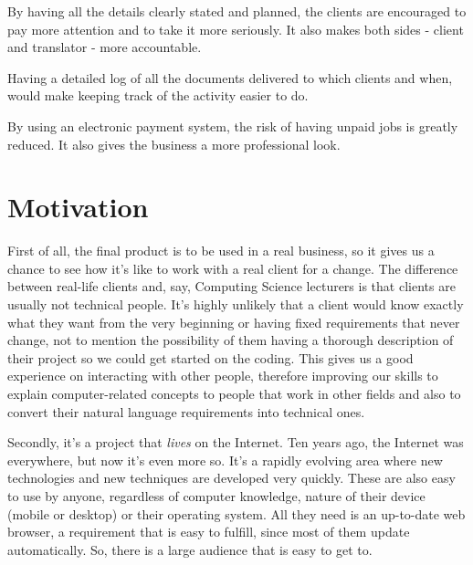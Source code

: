 \documentclass{article}
\begin{document}
By having all the details clearly stated and planned, the clients are encouraged
to pay more attention and to take it more seriously. It also makes both sides
- client and translator - more accountable.

Having a detailed log of all the documents delivered to which clients and when,
would make keeping track of the activity easier to do.

By using an electronic payment system, the risk of having unpaid jobs is greatly
reduced. It also gives the business a more professional look.

\section*{Motivation}
First of all, the final product is to be used in a real business, so it gives
us a chance to see how it's like to work with a real client for a change.
The difference between real-life clients and, say, Computing Science lecturers
is that clients are usually not technical people. It's highly unlikely that a 
client would know exactly what they want from the very beginning or having
fixed requirements that never change, not to mention the possibility of them
having a thorough description of their project so we could get started on
the coding. This gives us a good experience on interacting with other people,
therefore improving our skills to explain computer-related concepts to people
that work in other fields and also to convert their natural language
requirements into technical ones.


Secondly, it's a project that \emph{lives} on the Internet. Ten years ago, the
Internet was everywhere, but now it's even more so. It's a rapidly evolving
area where new technologies and new techniques are developed very quickly.
These are also easy to use by anyone, regardless of computer knowledge,
nature of their device (mobile or desktop) or their operating system. All they
need is an up-to-date web browser, a requirement that is easy to fulfill,
since most of them update automatically. So, there is a large audience that
is easy to get to.
\end{document}
